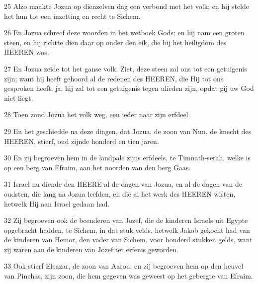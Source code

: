 \par 25 Alzo maakte Jozua op dienzelven dag een verbond met het volk; en hij stelde het hun tot een inzetting en recht te Sichem.
\par 26 En Jozua schreef deze woorden in het wetboek Gods; en hij nam een groten steen, en hij richtte dien daar op onder den eik, die bij het heiligdom des HEEREN was.
\par 27 En Jozua zeide tot het ganse volk: Ziet, deze steen zal ons tot een getuigenis zijn; want hij heeft gehoord al de redenen des HEEREN, die Hij tot ons gesproken heeft; ja, hij zal tot een getuigenis tegen ulieden zijn, opdat gij uw God niet liegt.
\par 28 Toen zond Jozua het volk weg, een ieder naar zijn erfdeel.
\par 29 En het geschiedde na deze dingen, dat Jozua, de zoon van Nun, de knecht des HEEREN, stierf, oud zijnde honderd en tien jaren.
\par 30 En zij begroeven hem in de landpale zijns erfdeels, te Timnath-serah, welke is op een berg van Efraim, aan het noorden van den berg Gaas.
\par 31 Israel nu diende den HEERE al de dagen van Jozua, en al de dagen van de oudsten, die lang na Jozua leefden, en die al het werk des HEEREN wisten, hetwelk Hij aan Israel gedaan had.
\par 32 Zij begroeven ook de beenderen van Jozef, die de kinderen Israels uit Egypte opgebracht hadden, te Sichem, in dat stuk velds, hetwelk Jakob gekocht had van de kinderen van Hemor, den vader van Sichem, voor honderd stukken gelds, want zij waren aan de kinderen van Jozef ter erfenis geworden.
\par 33 Ook stierf Eleazar, de zoon van Aaron; en zij begroeven hem op den heuvel van Pinehas, zijn zoon, die hem gegeven was geweest op het gebergte van Efraim.





